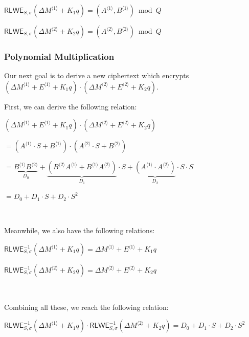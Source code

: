 $\textsf{RLWE}_{S, \sigma}(\Delta M^{\langle 1 \rangle} + K_1q) = (A^{\langle 1 \rangle}, B^{\langle 1 \rangle}) \bmod Q$

$\textsf{RLWE}_{S, \sigma}(\Delta M^{\langle 2 \rangle} + K_2q) = (A^{\langle 2 \rangle}, B^{\langle 2 \rangle}) \bmod Q$


\subsubsection{Polynomial Multiplication}
\label{subsubsec:bfv-mult-cipher-multiplication}

Our next goal is to derive a new ciphertext which encrypts 
$(\Delta M^{\langle 1 \rangle} + E^{\langle 1 \rangle} + K_1q) \cdot (\Delta M^{\langle 2 \rangle} + E^{\langle 2 \rangle} + K_2q)$. 

First, we can derive the following relation: 

$(\Delta M^{\langle 1 \rangle} + E^{\langle 1 \rangle} + K_1q) \cdot (\Delta M^{\langle 2 \rangle} + E^{\langle 2 \rangle} + K_2q)$

$ = (A^{\langle 1 \rangle} \cdot S + B^{\langle 1 \rangle}) \cdot (A^{\langle 2 \rangle} \cdot S + B^{\langle 2 \rangle})$

$ = \underbrace{B^{\langle 1 \rangle}B^{\langle 2 \rangle}}_{D_0}  + \underbrace{(B^{\langle 2 \rangle}A^{\langle 1 \rangle} + B^{\langle 1 \rangle}A^{\langle 2 \rangle})}_{D_1} \cdot S + \underbrace{(A^{\langle 1 \rangle} \cdot A^{\langle 2 \rangle})}_{D_2} \cdot S \cdot S $



$= D_0 + D_1\cdot S + D_2\cdot S^2$



$ $

Meanwhile, we also have the following relations:

$\textsf{RLWE}_{S, \sigma}^{-1}(\Delta M^{\langle 1 \rangle} + K_1q) = \Delta M^{\langle 1 \rangle} + E^{\langle 1 \rangle} + K_1q$

$\textsf{RLWE}_{S, \sigma}^{-1}(\Delta M^{\langle 2 \rangle} + K_2q) = \Delta M^{\langle 2 \rangle} + E^{\langle 2 \rangle} + K_2q$

$ $

Combining all these, we reach the following relation: 

$\textsf{RLWE}_{S, \sigma}^{-1}(\Delta M^{\langle 1 \rangle} + K_1q) \cdot \textsf{RLWE}_{S, \sigma}^{-1}(\Delta M^{\langle 2 \rangle} + K_2q) = D_0 + D_1\cdot S + D_2\cdot S^2$

$ $


